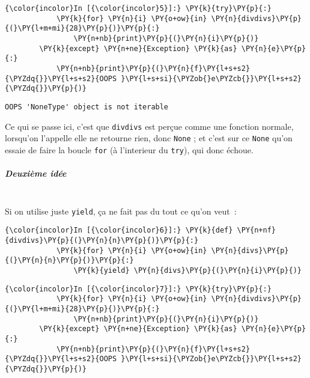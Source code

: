     \begin{Verbatim}[commandchars=\\\{\}]
{\color{incolor}In [{\color{incolor}5}]:} \PY{k}{try}\PY{p}{:}
            \PY{k}{for} \PY{n}{i} \PY{o+ow}{in} \PY{n}{divdivs}\PY{p}{(}\PY{l+m+mi}{28}\PY{p}{)}\PY{p}{:}
                \PY{n+nb}{print}\PY{p}{(}\PY{n}{i}\PY{p}{)}
        \PY{k}{except} \PY{n+ne}{Exception} \PY{k}{as} \PY{n}{e}\PY{p}{:}
            \PY{n+nb}{print}\PY{p}{(}\PY{n}{f}\PY{l+s+s2}{\PYZdq{}}\PY{l+s+s2}{OOPS }\PY{l+s+si}{\PYZob{}e\PYZcb{}}\PY{l+s+s2}{\PYZdq{}}\PY{p}{)}
\end{Verbatim}


    \begin{Verbatim}[commandchars=\\\{\}]
OOPS 'NoneType' object is not iterable

    \end{Verbatim}

    Ce qui se passe ici, c'est que \texttt{divdivs} est perçue comme une
fonction normale, lorsqu'on l'appelle elle ne retourne rien, donc
\texttt{None} ; et c'est sur ce \texttt{None} qu'on essaie de faire la
boucle \texttt{for} (à l'interieur du \texttt{try}), qui donc échoue.

    \hypertarget{deuxiuxe8me-iduxe9e}{%
\subparagraph{Deuxième idée\\\\}\label{deuxiuxe8me-iduxe9e}}

    Si on utilise juste \texttt{yield}, ça ne fait pas du tout ce qu'on
veut~:

    \begin{Verbatim}[commandchars=\\\{\}]
{\color{incolor}In [{\color{incolor}6}]:} \PY{k}{def} \PY{n+nf}{divdivs}\PY{p}{(}\PY{n}{n}\PY{p}{)}\PY{p}{:}
            \PY{k}{for} \PY{n}{i} \PY{o+ow}{in} \PY{n}{divs}\PY{p}{(}\PY{n}{n}\PY{p}{)}\PY{p}{:}
                \PY{k}{yield} \PY{n}{divs}\PY{p}{(}\PY{n}{i}\PY{p}{)}
\end{Verbatim}


    \begin{Verbatim}[commandchars=\\\{\}]
{\color{incolor}In [{\color{incolor}7}]:} \PY{k}{try}\PY{p}{:}
            \PY{k}{for} \PY{n}{i} \PY{o+ow}{in} \PY{n}{divdivs}\PY{p}{(}\PY{l+m+mi}{28}\PY{p}{)}\PY{p}{:}
                \PY{n+nb}{print}\PY{p}{(}\PY{n}{i}\PY{p}{)}
        \PY{k}{except} \PY{n+ne}{Exception} \PY{k}{as} \PY{n}{e}\PY{p}{:}
            \PY{n+nb}{print}\PY{p}{(}\PY{n}{f}\PY{l+s+s2}{\PYZdq{}}\PY{l+s+s2}{OOPS }\PY{l+s+si}{\PYZob{}e\PYZcb{}}\PY{l+s+s2}{\PYZdq{}}\PY{p}{)}
\end{Verbatim}


